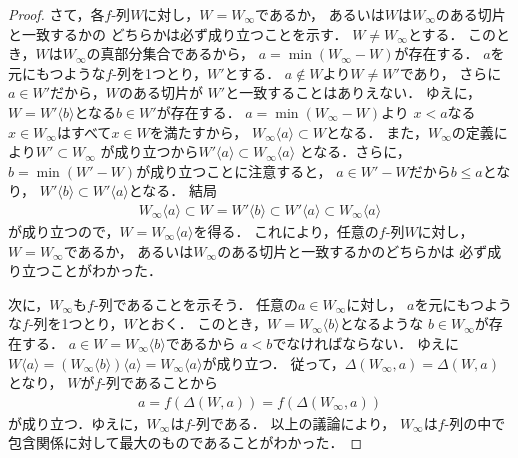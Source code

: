 \begin{proof}
    さて，各$f$-列$W$に対し，$W=W_{\infty}$であるか，
    あるいは$W$は$W_{\infty}$のある切片と一致するかの
    どちらかは必ず成り立つことを示す．
    $W \neq W_{\infty}$とする．
    このとき，$W$は$W _{\infty} $の真部分集合であるから，
    $a = \min ( W_{\infty} - W )$が存在する．
    $a$を元にもつような$f$-列を1つとり，$W'$とする．
    $a \notin W$より$W \neq W'$であり，
    さらに$a \in W'$だから，$W$のある切片が
    $W'$と一致することはありえない．
    ゆえに，$W= W' \langle b \rangle$となる$b \in W'$が存在する． 
    $a = \min (W_{\infty} - W)$より
    $x<a$なる$x \in W_{\infty}$はすべて$x \in W$を満たすから，
    $W_{\infty} \langle a \rangle \subset W$となる．
    また，$W_{\infty}$の定義により$W' \subset W_{\infty}$
    が成り立つから$W' \langle a \rangle \subset W_{\infty} \langle a \rangle$
    となる．さらに，$b = \min (W'-W)$が成り立つことに注意すると，
    $a \in W' - W$だから$b \leq a$となり，
    $W' \langle b \rangle \subset W' \langle a \rangle $となる．
    結局
    \begin{align*}
      W_{\infty} \langle a \rangle \subset W = W' \langle b \rangle
      \subset W' \langle a \rangle \subset W_{\infty} \langle a \rangle
    \end{align*}
    が成り立つので，$W= W_{\infty} \langle a \rangle$を得る．
    これにより，任意の$f$-列$W$に対し，$W=W_{\infty}$であるか，
    あるいは$W_{\infty}$のある切片と一致するかのどちらかは
    必ず成り立つことがわかった．


    次に，$W_{\infty}$も$f$-列であることを示そう．
    任意の$a \in W_{\infty}$に対し，
    $a$を元にもつような$f$-列を1つとり，$W$とおく．
    このとき，$W=W_{\infty} \langle b \rangle$となるような
    $b \in W_{\infty}$が存在する．
    $a \in W = W_{\infty} \langle b \rangle$であるから
    $a<b$でなければならない．
    ゆえに$W \langle a \rangle = (W_{\infty} \langle b \rangle ) \langle a \rangle 
    = W_{\infty} \langle a \rangle $が成り立つ．
    従って，$\varDelta ( W_{\infty} , a ) = \varDelta ( W , a)$となり，
    $W$が$f$-列であることから
    \begin{align*}
      a= f ( \varDelta (W, a ) ) = f( \varDelta ( W_{\infty} ,a ) )
    \end{align*}
    が成り立つ．ゆえに，$W_{\infty}$は$f$-列である．
    以上の議論により，
    $W_{\infty}$は$f$-列の中で包含関係に対して最大のものであることがわかった．


\end{proof}
